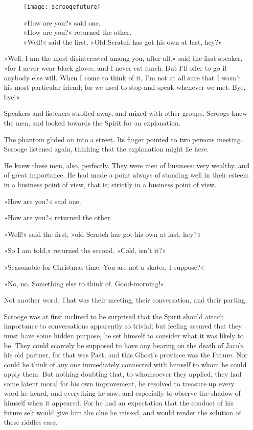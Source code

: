 \begin{figure}[p]
\begin{minipage}[c]{\textwidth}
\texttt{[image: scroogefuture]}
\caption[\textbf{»Old Scratch has got his own at last, hey?«}]{»How are you?« said one.\\
»How are you?« returned the other.\\
»Well!« said the first. »Old Scratch has got his own at last, hey?«}
\end{minipage}
\end{figure}

»Well, I am the most disinterested among you, after all,« said the first speaker, »for I never wear black gloves, and I never eat lunch. But I'll offer to go if anybody else will. When I come to think of it, I'm not at all sure that I wasn't his most particular friend; for we used to stop and speak whenever we met. Bye, bye!«

Speakers and listeners strolled away, and mixed with other groups. Scrooge knew the men, and looked towards the Spirit for an explanation.

The phantom glided on into a street. Its finger pointed to two persons meeting. Scrooge listened again, thinking that the explanation might lie here.

He knew these men, also, perfectly. They were men of business: very wealthy, and of great importance. He had made a point always of standing well in their esteem in a business point of view, that is; strictly in a business point of view.

»How are you?« said one.

»How are you?« returned the other.

»Well!« said the first, »old Scratch has got his own at last, hey?«

»So I am told,« returned the second. »Cold, isn't it?«

»Seasonable for Christmas-time. You are not a skater, I suppose?«

»No, no. Something else to think of. Good-morning!«

Not another word. That was their meeting, their conversation, and their parting.

Scrooge was at first inclined to be surprised that the Spirit should attach importance to conversations apparently so trivial; but feeling assured that they must have some hidden purpose, he set himself to consider what it was likely to be. They could scarcely be supposed to have any bearing on the death of Jacob, his old partner, for that was Past, and this Ghost's province was the Future. Nor could he think of any one immediately connected with himself to whom he could apply them. But nothing doubting that, to whomsoever they applied, they had some latent moral for his own improvement, he resolved to treasure up every word he heard, and everything he saw; and especially to observe the shadow of himself when it appeared. For he had an expectation that the conduct of his future self would give him the clue he missed, and would render the solution of these riddles easy.

